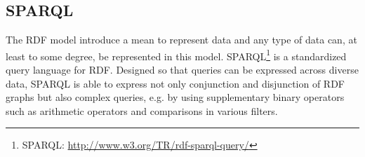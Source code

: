 \begin{table}
\centering
{}%
\caption{N-Triple representation of the RDF graph in
Figure~\ref{fig:rdf-graph}.}
\label{tab:TL-ntriples}
\end{table}

\subsection{SPARQL}

The RDF model introduce a mean to represent data and any type of data can,
at least to some degree, be represented in this model. SPARQL\footnote{SPARQL:
\url{http://www.w3.org/TR/rdf-sparql-query/}} is a standardized query language
for RDF. Designed so that queries can be expressed across diverse data, SPARQL
is able to express not only conjunction and disjunction of RDF graphs but also
complex queries, e.g. by using supplementary binary operators such as
arithmetic operators and comparisons in various filters.

